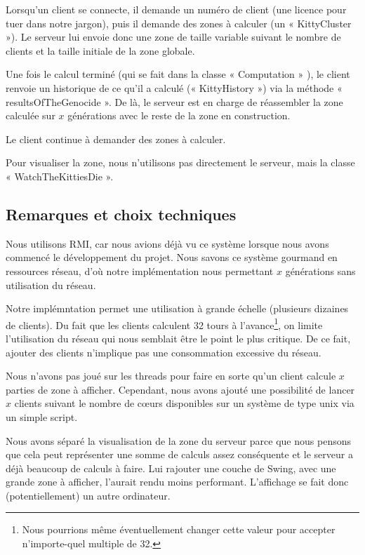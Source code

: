 \documentclass[twoside]{article}
\begin{document}
Lorsqu'un client se connecte, il demande un numéro de client (une licence pour tuer dans notre jargon), puis il demande des zones à calculer (un « KittyCluster »).
Le serveur lui envoie donc une zone de taille variable suivant le nombre de clients et la taille initiale de la zone globale.

Une fois le calcul terminé (qui se fait dans la classe « Computation » ), le client renvoie un historique de ce qu'il a calculé (« KittyHistory ») via la méthode « resultsOfTheGenocide ».
De là, le serveur est en charge de réassembler la zone calculée sur $x$ générations avec le reste de la zone en construction.

Le client continue à demander des zones à calculer.

Pour visualiser la zone, nous n'utilisons pas directement le serveur, mais la classe « WatchTheKittiesDie ».

\subsection{Remarques et choix techniques}
Nous utilisons RMI, car nous avions déjà vu ce système lorsque nous avons commencé le développement du projet.
Nous savons ce système gourmand en ressources réseau, d'où notre implémentation nous permettant $x$ générations sans utilisation du réseau.

Notre implémntation permet une utilisation à grande échelle (plusieurs dizaines de clients).
Du fait que les clients calculent 32 tours à l'avance\protect\footnote{
	Nous pourrions même éventuellement changer cette valeur pour accepter n'importe-quel multiple de 32.
}, on limite l'utilisation du réseau qui nous semblait être le point le plus critique.
De ce fait, ajouter des clients n'implique pas une consommation excessive du réseau.

Nous n'avons pas joué sur les threads pour faire en sorte qu'un client calcule $x$ parties de zone à afficher.
Cependant, nous avons ajouté une possibilité de lancer $x$ clients suivant le nombre de cœurs disponibles sur un système de type unix via un simple script.

Nous avons séparé la visualisation de la zone du serveur parce que nous pensons que cela peut représenter une somme de calculs assez conséquente et le serveur a déjà beaucoup de calculs à faire. 
Lui rajouter une couche de Swing, avec une grande zone à afficher, l'aurait rendu moins performant.
L'affichage se fait donc (potentiellement) un autre ordinateur.
\end{document}
